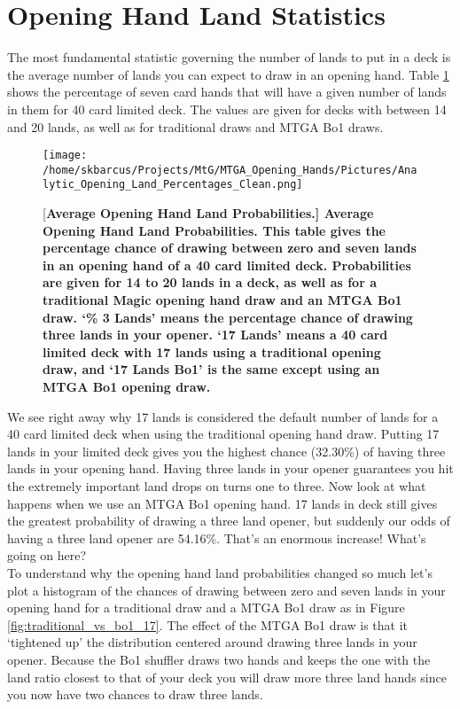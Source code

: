 \documentclass[oneside]{book}   %
\begin{document}
\section{Opening Hand Land Statistics}
\label{opener}

The most fundamental statistic governing the number of lands to put in a deck is the average number of lands you can expect to draw in an opening hand. Table \ref{fig:opening_hand_probabilities} shows the percentage of seven card hands that will have a given number of lands in them for 40 card limited deck. The values are given for decks with between 14 and 20 lands, as well as for traditional draws and MTGA Bo1 draws. \\ 

	\begin{figure}[!ht]
	\centering
	\centerline{\texttt{[image: /home/skbarcus/Projects/MtG/MTGA\_Opening\_Hands/Pictures/Analytic\_Opening\_Land\_Percentages\_Clean.png]}}
	[\bf{Average Opening Hand Land Probabilities.}]{
	{\bf{Average Opening Hand Land Probabilities.}} This table gives the percentage chance of drawing between zero and seven lands in an opening hand of a 40 card limited deck. Probabilities are given for 14 to 20 lands in a deck, as well as for a traditional Magic opening hand draw and an MTGA Bo1 draw. `\% 3 Lands' means the percentage chance of drawing three lands in your opener. `17 Lands' means a 40 card limited deck with 17 lands using a traditional opening draw, and `17 Lands Bo1' is the same except using an MTGA Bo1 opening draw.}
	\label{fig:opening_hand_probabilities}
	\end{figure}	
	
We see right away why 17 lands is considered the default number of lands for a 40 card limited deck when using the traditional opening hand draw. Putting 17 lands in your limited deck gives you the highest chance (32.30\%) of having three lands in your opening hand. Having three lands in your opener guarantees you hit the extremely important land drops on turns one to three. Now look at what happens when we use an MTGA Bo1 opening hand. 17 lands in deck still gives the greatest probability of drawing a three land opener, but suddenly our odds of having a three land opener are 54.16\%. That's an enormous increase! What's going on here?\\

To understand why the opening hand land probabilities changed so much let's plot a histogram of the chances of drawing between zero and seven lands in your opening hand for a traditional draw and a MTGA Bo1 draw as in Figure \ref{fig:traditional_vs_bo1_17}. The effect of the MTGA Bo1 draw is that it `tightened up' the distribution centered around drawing three lands in your opener. Because the Bo1 shuffler draws two hands and keeps the one with the land ratio closest to that of your deck you will draw more three land hands since you now have two chances to draw three lands. \\
\end{document}
